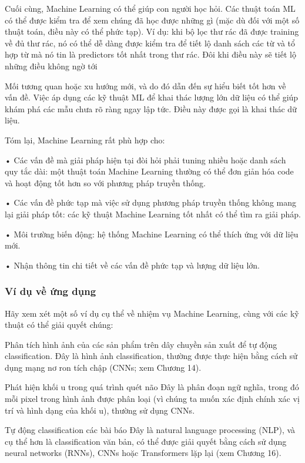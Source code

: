 Cuối cùng, Machine Learning có thể giúp con người học hỏi. Các thuật toán ML có thể được kiểm tra để xem chúng đã học được những gì (mặc dù đối với một số thuật toán, điều này có thể phức tạp). Ví dụ: khi bộ lọc thư rác đã được training về đủ thư rác, nó có thể dễ dàng được kiểm tra để tiết lộ danh sách các từ và tổ hợp từ mà nó tin là predictors tốt nhất trong thư rác. Đôi khi điều này sẽ tiết lộ những điều không ngờ tới

Mối tương quan hoặc xu hướng mới, và do đó dẫn đến sự hiểu biết tốt hơn về vấn đề. Việc áp dụng các kỹ thuật ML để khai thác lượng lớn dữ liệu có thể giúp khám phá các mẫu chưa rõ ràng ngay lập tức. Điều này được gọi là khai thác dữ liệu.

Tóm lại, Machine Learning rất phù hợp cho:

• Các vấn đề mà giải pháp hiện tại đòi hỏi phải tuning nhiều hoặc danh sách quy tắc dài: một thuật toán Machine Learning thường có thể đơn giản hóa code và hoạt động tốt hơn so với phương pháp truyền thống.

• Các vấn đề phức tạp mà việc sử dụng phương pháp truyền thống không mang lại giải pháp tốt: các kỹ thuật Machine Learning tốt nhất có thể tìm ra giải pháp.

• Môi trường biến động: hệ thống Machine Learning có thể thích ứng với dữ liệu mới.

• Nhận thông tin chi tiết về các vấn đề phức tạp và lượng dữ liệu lớn.

\subsubsection{Ví dụ về ứng dụng}

Hãy xem xét một số ví dụ cụ thể về nhiệm vụ Machine Learning, cùng với các kỹ thuật có thể giải quyết chúng:

Phân tích hình ảnh của các sản phẩm trên dây chuyền sản xuất để tự động classification. Đây là hình ảnh classification, thường được thực hiện bằng cách sử dụng mạng nơ ron tích chập (CNNs; xem Chương 14).

Phát hiện khối u trong quá trình quét não Đây là phân đoạn ngữ nghĩa, trong đó mỗi pixel trong hình ảnh được phân loại (vì chúng ta muốn xác định chính xác vị trí và hình dạng của khối u), thường sử dụng CNNs.

Tự động classification các bài báo Đây là natural language processing (NLP), và cụ thể hơn là classification văn bản, có thể được giải quyết bằng cách sử dụng neural networks (RNNs), CNNs hoặc Transformers lặp lại (xem Chương 16).

